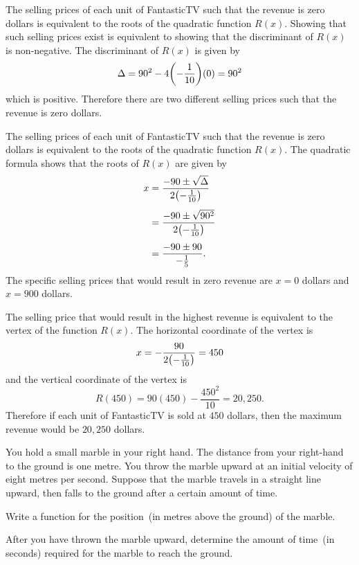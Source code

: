 \documentclass[a4paper,oneside,12pt]{article}
\begin{document}
\begin{problem}
{\begin{solution}
The selling prices of each unit of FantasticTV such that the revenue
is zero dollars is equivalent to the roots of the quadratic function
$R(x)$.  Showing that such selling prices exist is equivalent to
showing that the discriminant of $R(x)$ is non-negative.  The
discriminant of $R(x)$ is given by
\[
\Delta
=
90^2 - 4\parenthesis*{-\frac{1}{10}}(0)
=
90^2
\]
which is positive.  Therefore there are two different selling prices
such that the revenue is zero dollars.

The selling prices of each unit of FantasticTV such that the revenue
is zero dollars is equivalent to the roots of the quadratic function
$R(x)$.  The quadratic formula shows that the roots of $R(x)$ are
given by
\begin{align*}
x
&=
\frac{
  -90 \pm \sqrt{\Delta}
}{
  2\parenthesis*{-\frac{1}{10}}
} \\[4pt]
&=
\frac{
  -90 \pm \sqrt{90^2}
}{
  2\parenthesis*{-\frac{1}{10}}
} \\[4pt]
&=
\frac{
  -90 \pm 90
}{
  -\frac{1}{5}
}.
\end{align*}
The specific selling prices that would result in zero revenue are
$x = 0$ dollars and $x = 900$ dollars.

The selling price that would result in the highest revenue is
equivalent to the vertex of the function $R(x)$.  The horizontal
coordinate of the vertex is
\[
x
=
-\frac{
  90
}{
  2\parenthesis*{-\frac{1}{10}}
}
=
450
\]
and the vertical coordinate of the vertex is
\[
R(450)
=
90(450) - \frac{450^2}{10}
=
20,250.
\]
Therefore if each unit of FantasticTV is sold at $450$ dollars, then
the maximum revenue would be $20,250$ dollars.
\end{solution}
}{}

\item You hold a small marble in your right hand.  The distance from
  your right-hand to the ground is one metre.  You throw the marble
  upward at an initial velocity of eight metres per second.  Suppose
  that the marble travels in a straight line upward, then falls to the
  ground after a certain amount of time.
  \begin{packedenum}
  \item\label{subprob:marble_distance_function}
    Write a function for the position~(in metres above the ground) of
    the marble.

  \item\label{subprob:marble_time_to_land}
    After you have thrown the marble upward, determine the amount of
    time~(in seconds) required for the marble to reach the ground.


\end{packedenum}
\end{problem}
\end{document}
